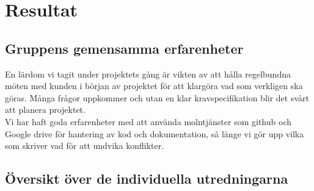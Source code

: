 \section{Resultat}
\lipsum	
\subsection{Gruppens gemensamma erfarenheter}
En lärdom vi tagit under projektets gång är vikten av att hålla regelbundna möten med kunden i början av projektet för att klargöra vad som verkligen ska göras. Många frågor uppkommer och utan en klar kravspecifikation blir det svårt att planera projektet.
\\
Vi har haft goda erfarenheter med att använda molntjänster som github och Google drive för hantering av kod och dokumentation, så länge vi gör upp vilka som skriver vad för att undvika konflikter.     


\subsection{Översikt över de individuella utredningarna}
